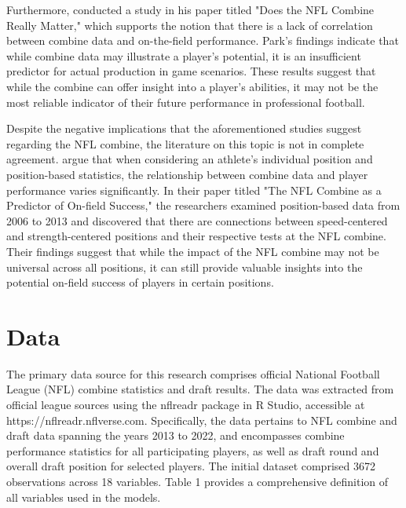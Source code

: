 \documentclass[12pt,english]{article}
\begin{document}
Furthermore, \citet{Park2016DoesTN} conducted a study in his paper titled "Does the NFL Combine Really Matter," which supports the notion that there is a lack of correlation between combine data and on-the-field performance. Park's findings indicate that while combine data may illustrate a player's potential, it is an insufficient predictor for actual production in game scenarios. These results suggest that while the combine can offer insight into a player's abilities, it may not be the most reliable indicator of their future performance in professional football.

Despite the negative implications that the aforementioned studies suggest regarding the NFL combine, the literature on this topic is not in complete agreement. \citet{Parekh2017TheNC} argue that when considering an athlete's individual position and position-based statistics, the relationship between combine data and player performance varies significantly. In their paper titled "The NFL Combine as a Predictor of On-field Success," the researchers examined position-based data from 2006 to 2013 and discovered that there are connections between speed-centered and strength-centered positions and their respective tests at the NFL combine. Their findings suggest that while the impact of the NFL combine may not be universal across all positions, it can still provide valuable insights into the potential on-field success of players in certain positions.

\section{Data}\label{sec:data}
The primary data source for this research comprises official National Football League (NFL) combine statistics and draft results. The data was extracted from official league sources using the nflreadr package in R Studio, accessible at https://nflreadr.nflverse.com. Specifically, the data pertains to NFL combine and draft data spanning the years 2013 to 2022, and encompasses combine performance statistics for all participating players, as well as draft round and overall draft position for selected players. The initial dataset comprised 3672 observations across 18 variables. Table 1 provides a comprehensive definition of all variables used in the models.
\end{document}
